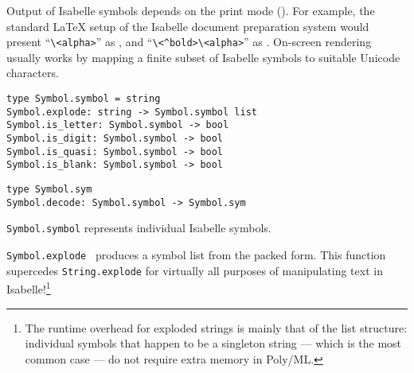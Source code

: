 \begin{isabellebody}
\begin{isamarkuptext}
  \medskip Output of Isabelle symbols depends on the print mode
  ().  For example, the standard {\LaTeX} setup of
  the Isabelle document preparation system would present
  ``\verb,\,\verb,<alpha>,'' as \isa{{\isasymalpha}}, and
  ``\verb,\,\verb,<^bold>,\verb,\,\verb,<alpha>,'' as \isa{\isactrlbold {\isasymalpha}}.  On-screen rendering usually works by mapping a finite
  subset of Isabelle symbols to suitable Unicode characters.%
\end{isamarkuptext}%
\isamarkuptrue%
%
\isadelimmlref
%
\endisadelimmlref
%
\isatagmlref
%
\begin{isamarkuptext}%
\begin{mldecls}
  \verb|type Symbol.symbol = string| \\
  \verb|Symbol.explode: string -> Symbol.symbol list| \\
  \verb|Symbol.is_letter: Symbol.symbol -> bool| \\
  \verb|Symbol.is_digit: Symbol.symbol -> bool| \\
  \verb|Symbol.is_quasi: Symbol.symbol -> bool| \\
  \verb|Symbol.is_blank: Symbol.symbol -> bool| \\
  \end{mldecls}
  \begin{mldecls}
  \verb|type Symbol.sym| \\
  \verb|Symbol.decode: Symbol.symbol -> Symbol.sym| \\
  \end{mldecls}

  \begin{description}

  \item \verb|Symbol.symbol| represents individual Isabelle
  symbols.

  \item \verb|Symbol.explode|~ produces a symbol list
  from the packed form.  This function supercedes \verb|String.explode| for virtually all purposes of manipulating text in
  Isabelle!\footnote{The runtime overhead for exploded strings is
  mainly that of the list structure: individual symbols that happen to
  be a singleton string --- which is the most common case --- do not
  require extra memory in Poly/ML.}


\end{description}
\end{isamarkuptext}
\end{isabellebody}
